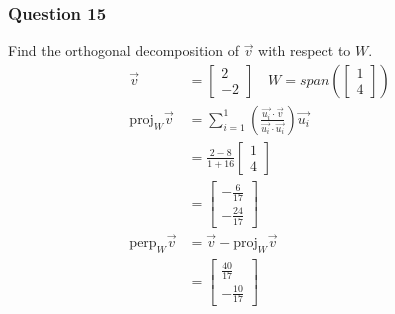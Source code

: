\documentclass{math}
\begin{document}
\subsubsection*{Question 15}
Find the orthogonal decomposition of \( \vec{v} \) with respect to \( W \).
\begin{align*}
  \vec{v} &= \begin{bmatrix}2 \\ -2\end{bmatrix} \quad
    W = span\left(\begin{bmatrix}1 \\ 4\end{bmatrix}\right) \\
  \text{proj}_{W}\vec{v} &= \sum_{i=1}^{1}
    \left(\frac{\vec{u_i}\cdot\vec{v}}{\vec{u_i}\cdot\vec{u_i}}\right)
    \vec{u_i} \\
  &= \frac{2-8}{1+16}\begin{bmatrix}1 \\ 4\end{bmatrix} \\
  &= \begin{bmatrix}-\frac{6}{17} \\ -\frac{24}{17}\end{bmatrix} \\
  \text{perp}_{W}\vec{v} &= \vec{v}-\text{proj}_{W}\vec{v} \\
    &= \begin{bmatrix}\frac{40}{17} \\ -\frac{10}{17}\end{bmatrix}
\end{align*}
\end{document}
